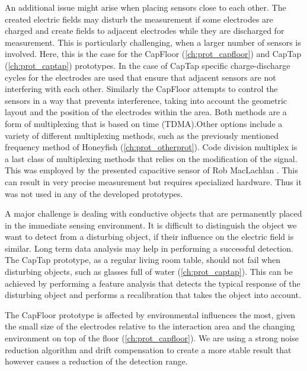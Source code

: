 An additional issue might arise when placing sensors close to each other. The created electric fields may disturb the measurement if some electrodes are charged and create fields to adjacent electrodes while they are discharged for measurement. This is particularly challenging, when a larger number of sensors is involved. Here, this is the case for the CapFloor (\ref{ch:prot_capfloor}) and CapTap (\ref{ch:prot_captap}) prototypes. In the case of CapTap specific charge-discharge cycles for the electrodes are used that ensure that adjacent sensors are not interfering with each other. Similarly the CapFloor attempts to control the sensors in a way that prevents interference, taking into account the geometric layout and the position of the electrodes within the area. Both methods are a form of multiplexing that is based on time (TDMA).Other options include a variety of different multiplexing methods, such as the previously mentioned frequency method of Honeyfish (\ref{ch:prot_otherprot}). Code division multiplex is a last class of multiplexing methods that relies on the modification of the signal. This was employed by the presented capacitive sensor of Rob MacLachlan \cite{MacLachlan2004}. This can result in very precise measurement but requires specialized hardware. Thus it was not used in any of the developed prototypes.

A major challenge is dealing with conductive objects that are permanently placed in the immediate sensing environment. It is difficult to distinguish the object we want to detect from a disturbing object, if their influence on the electric field is similar. Long term data analysis may help in performing a successful detection. The CapTap prototype, as a regular living room table, should not fail when disturbing objects, such as glasses full of water (\ref{ch:prot_captap}). This can be achieved by performing a feature analysis that detects the typical response of the disturbing object and performs a recalibration that takes the object into account. 

The CapFloor prototype is affected by environmental influences the most, given the small size of the electrodes relative to the interaction area and the changing environment on top of the floor (\ref{ch:prot_capfloor}). We are using a strong noise reduction algorithm and drift compensation to create a more stable result that however causes a reduction of the detection range.
